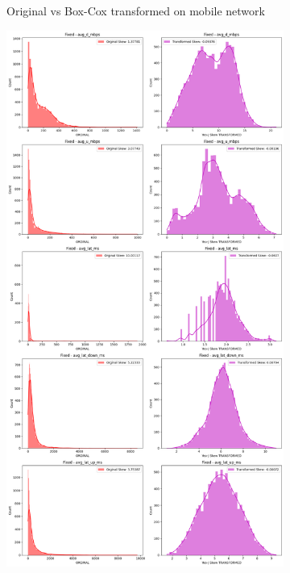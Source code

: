 \documentclass[
  letterpaper,
  DIV=11,
  numbers=noendperiod,
  oneside]{scrartcl}
\begin{document}
\begin{figure}
{\begin{figure}[H]
{}

\caption{Original vs Box-Cox transformed on mobile network}

\end{figure}

\begin{figure}[H]

{\centering \includegraphics{data-analytics_files/figure-latex/fig-transcomp-output-7.png}

}
\end{figure}}
\end{figure}
\end{document}

